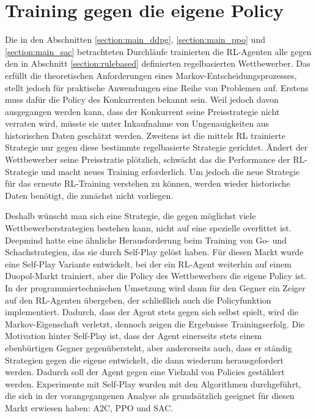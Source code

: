 \section{Training gegen die eigene Policy}
Die in den Abschnitten \ref{section:main_ddpg}, \ref{section:main_ppo} und \ref{section:main_sac} betrachteten Durchläufe trainierten die RL-Agenten alle gegen den in Abschnitt \ref{section:rulebased} definierten regelbasierten Wettbewerber.
Das erfüllt die theoretischen Anforderungen eines Markov-Entscheidungsprozesses, stellt jedoch für praktische Anwendungen eine Reihe von Problemen auf.
Erstens muss dafür die Policy des Konkurrenten bekannt sein.
Weil jedoch davon ausgegangen werden kann, dass der Konkurrent seine Preisstrategie nicht verraten wird, müsste sie unter Inkaufnahme von Ungenauigkeiten aus historischen Daten geschätzt werden.
Zweitens ist die mittels RL trainierte Strategie nur gegen diese bestimmte regelbasierte Strategie gerichtet.
Ändert der Wettbewerber seine Preisstratie plötzlich, schwächt das die Performance der RL-Strategie und macht neues Training erforderlich.
Um jedoch die neue Strategie für das erneute RL-Training verstehen zu können, werden wieder historische Daten benötigt, die zunächst nicht vorliegen.

Deshalb wünscht man sich eine Strategie, die gegen möglichst viele Wettbewerberstrategien bestehen kann, nicht auf eine spezielle overfittet ist.
Deepmind hatte eine ähnliche Herausforderung beim Training von Go- und Schachstrategien, das sie durch Self-Play gelöst haben. \cite{Silver2017, https://doi.org/10.48550/arxiv.1712.01815}
Für diesen Markt wurde eine Self-Play Variante entwickelt, bei der ein RL-Agent weiterhin auf einem Duopol-Markt trainiert, aber die Policy des Wettbewerbers die eigene Policy ist.
In der programmiertechnischen Umsetzung wird dann für den Gegner ein Zeiger auf den RL-Agenten übergeben, der schließlich auch die Policyfunktion implementiert.
Dadurch, dass der Agent stets gegen sich selbst spielt, wird die Markov-Eigenschaft verletzt, dennoch zeigen die Ergebnisse Trainingserfolg.
Die Motivation hinter Self-Play ist, dass der Agent einerseits stets einem ebenbürtigen Gegner gegenübersteht, aber andererseits auch, dass er ständig Strategien gegen die eigene entwickelt, die dann wiederum herausgefordert werden.
Dadurch soll der Agent gegen eine Vielzahl von Policies gestählert werden.
Experimente mit Self-Play wurden mit den Algorithmen durchgeführt, die sich in der vorangegangenen Analyse als grundsätzlich geeignet für diesen Markt erwiesen haben: A2C, PPO und SAC.

